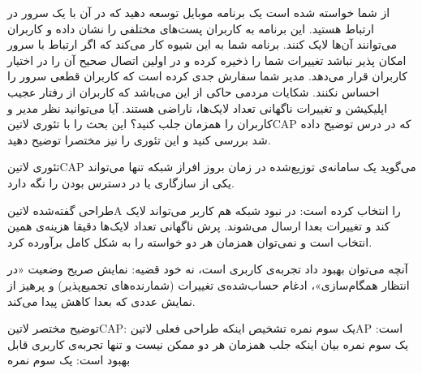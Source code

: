 
از شما خواسته شده است یک برنامه موبایل توسعه دهید که در آن با یک سرور در ارتباط هستید. این برنامه به کاربران پست‌های مختلفی را نشان داده و کاربران می‌توانند آن‌ها لایک کنند.
برنامه شما به این شیوه کار می‌کند که اگر ارتباط با سرور امکان پذیر نباشد تغییرات شما را ذخیره کرده و در اولین اتصال صحیح آن را در اختیار کاربران قرار می‌دهد.
مدیر شما سفارش جدی کرده است که کاربران قطعی سرور را احساس نکنند.
شکایات مردمی حاکی از این می‌باشد که کاربران از رفتار عجیب اپلیکیشن و تغییرات ناگهانی تعداد لایک‌ها، ناراضی هستند.
آیا می‌توانید نظر مدیر و کاربران را همزمان جلب کنید؟ این بحث را با تئوری ‌لاتین{CAP} که در درس توضیح داده شد بررسی کنید و این تئوری را نیز مختصرا توضیح دهید.


\begin{پاسخ}

تئوری ‌لاتین{CAP} می‌گوید یک سامانه‌ی توزیع‌شده در زمان بروز افراز شبکه تنها می‌تواند یکی از سازگاری یا در دسترس بودن را نگه دارد.

طراحی گفته‌شده ‌لاتین{A} را انتخاب کرده است: در نبود شبکه هم کاربر می‌تواند لایک کند و تغییرات بعدا ارسال می‌شوند.
پرش ناگهانی تعداد لایک‌ها دقیقا هزینه‌ی همین انتخاب است و نمی‌توان همزمان هر دو خواسته را به شکل کامل برآورده کرد.

آنچه می‌توان بهبود داد تجربه‌ی کاربری است، نه خود قضیه: نمایش صریح وضعیت «در انتظار همگام‌سازی»، ادغام حساب‌شده‌ی تغییرات (شمارنده‌های تجمیع‌پذیر) و پرهیز از نمایش عددی که بعدا کاهش پیدا می‌کند.

 توضیح مختصر ‌لاتین{CAP}: یک سوم نمره
 تشخیص اینکه طراحی فعلی ‌لاتین{AP} است: یک سوم نمره
 بیان اینکه جلب همزمان هر دو ممکن نیست و تنها تجربه‌ی کاربری قابل بهبود است: یک سوم نمره

\end{پاسخ}
